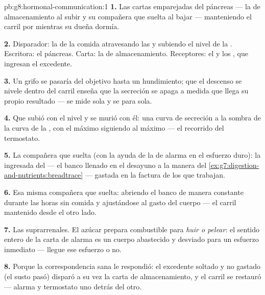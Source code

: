 \begin{solution}{pb:g8:hormonal-communication:1}
\textbf{1.} Las cartas emparejadas del páncreas --- la  de
almacenamiento al subir y su compañera que suelta al bajar ---
manteniendo el carril por  mientras su dueña dormía.

\textbf{2.} Disparador: la  de la comida atravesando las
 y subiendo el nivel de la . Escritora: el páncreas.
Carta: la  de almacenamiento. Receptores: el  y los
, que ingresan el excedente.

\textbf{3.} Un grifo se pasaría del objetivo hasta un hundimiento; que
el descenso se nivele dentro del carril enseña que la secreción se
apaga a medida que llega su propio resultado --- se mide sola y se para
sola.

\textbf{4.} Que subió con el nivel y se murió con él: una curva de
secreción a la sombra de la curva de la , con el máximo
siguiendo al máximo --- el recorrido del termostato.

\textbf{5.} La compañera que suelta (con la ayuda de la  de
alarma en el esfuerzo duro): la  ingresada del  --- el
banco llenado en el desayuno a la manera del
\cref{ex:g7:digestion-and-nutrients:breadtrace} --- gastada en la
factura de los  que trabajan.

\textbf{6.} Esa misma compañera que suelta: abriendo el banco de manera
constante durante las horas sin comida y ajustándose al gasto del
cuerpo --- el carril mantenido desde el otro lado.

\textbf{7.} Las  suprarrenales. El azúcar prepara combustible
para \emph{huir o pelear}: el sentido entero de la carta de alarma es
un cuerpo abastecido y desviado para un esfuerzo inmediato --- llegue
ese esfuerzo o no.

\textbf{8.} Porque la correspondencia sana le respondió: el excedente
soltado y no gastado (el susto pasó) disparó a su vez la carta de
almacenamiento, y el carril se restauró --- alarma y termostato uno
detrás del otro.


\end{solution}
